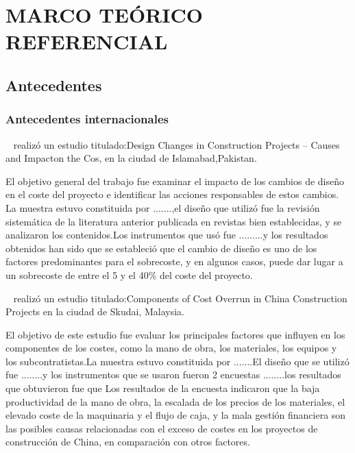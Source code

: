\pagestyle{myheadings}
\chapter{MARCO TEÓRICO REFERENCIAL}
\section{Antecedentes}

\subsection{Antecedentes internacionales}

~\cite{Aslam2019} realizó un estudio titulado:Design Changes in Construction Projects – Causes and Impacton the Cos, en la ciudad de Islamabad,Pakistan.

El objetivo general del trabajo fue examinar el impacto de los cambios de diseño en el coste del proyecto e identificar las acciones responsables de estos cambios. La muestra estuvo constituida por .......,el diseño que utilizó fue la revisión sistemática de la literatura anterior publicada en revistas bien establecidas, y se analizaron los contenidos.Los instrumentos que usó fue .........y los resultados obtenidos han sido que se estableció que el cambio de diseño es uno de los factores predominantes para el sobrecoste, y en algunos casos, puede dar lugar a un sobrecoste de entre el 5 y el 40\% del coste del proyecto. 

~\cite{Mansur2019} realizó un estudio titulado:Components of Cost Overrun in China Construction Projects en la ciudad de  Skudai, Malaysia.

El objetivo de este estudio fue evaluar los principales factores que influyen en los componentes de los costes, como la mano de obra, los materiales, los equipos y los subcontratistas.La muestra estuvo constituida por .......El diseño que se utilizó fue ........y los instrumentos que se usaron fueron 2 encuestas ........los resultados que obtuvieron fue que Los resultados de la encuesta indicaron que la baja productividad de la mano de obra, la escalada de los precios de los materiales, el elevado coste de la maquinaria y el flujo de caja, y la mala gestión financiera son las posibles causas relacionadas con el exceso de costes en los proyectos de construcción de China, en comparación con otros factores.

